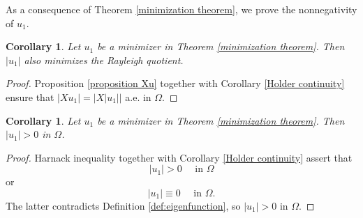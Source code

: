 \documentclass[a4paper,12pt,reqno]{amsart}
\numberwithin{equation}{section}
\theoremstyle{plain}
\newtheorem{cor}[thm]{Corollary}
\theoremstyle{definition}
\begin{document}
As a consequence of Theorem \ref{minimization theorem}, we prove the nonnegativity of $u_{1}$.
\begin{cor}
Let $u_{1}$ be a minimizer in Theorem \ref{minimization theorem}. Then $|u_{1}|$ also minimizes the Rayleigh quotient.
\end{cor}
\begin{proof}
Proposition \ref{proposition Xu} together with Corollary \ref{Holder continuity} ensure that $|Xu_{1}|=|X|u_{1}||$  a.e. in $\Omega$.
\end{proof}

\begin{cor}\label{Harnack inequality}
Let $u_{1}$ be a minimizer in Theorem \ref{minimization theorem}. Then $|u_{1}|>0$ in $\Omega$.
\end{cor}
\begin{proof}
Harnack inequality \cite[Theorem 3.9]{Lu1996} together with Corollary \ref{Holder continuity}
 assert that 
$$|u_{1}|>0 \quad \text{ in } \Omega$$ 
or 
$$|u_{1}|\equiv 0 \quad \text{  in } \Omega.$$  
The latter  contradicts Definition \ref{def:eigenfunction}, so  $|u_{1}|>0$ in $\Omega$. 
\end{proof}
\end{document}
